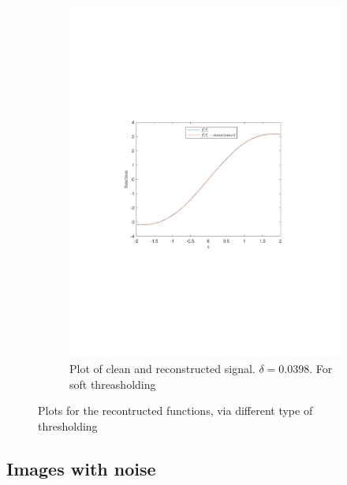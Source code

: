 \documentclass[a4paper]{article}
\begin{document}
\begin{figure}[H]
\begin{subfigure}{0.49\textwidth}
	\includegraphics[trim={3.5cm 8cm 4cm 9cm},clip,width=1\textwidth]{Images/SoftFunc.pdf}
	\caption{Plot of clean and reconstructed signal. $\delta = 0.0398$. For soft threasholding}
	\label{sub:BestDeltaSoftFunc}
\end{subfigure}
\caption{Plots for the recontructed functions, via different type of thresholding}
\label{fig:OptiDelta}
\end{figure}

    \subsection{Images with noise}
\end{document}
